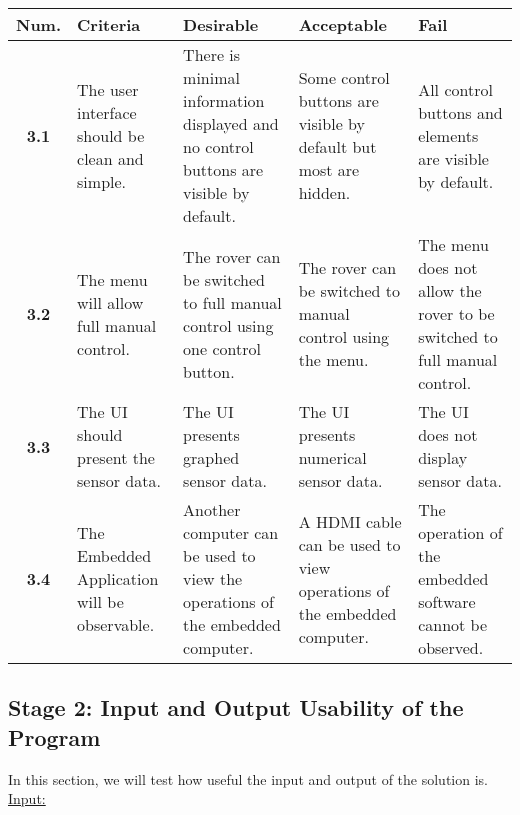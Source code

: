 \documentclass[11pt]{report}
\begin{document}
		\noindent
		\begin{tabularx}{\textwidth}{|S|B|B|B|B|}
			\hline
			\textbf{Num.}     & \textbf{Criteria}     & \textbf{Desirable}    & \textbf{Acceptable} &  \textbf{Fail}	 \\ \hline
			\textbf{3.1} & The user interface should be clean and simple.        & There is minimal information displayed and no control buttons are visible by default.   & Some control buttons are visible by default but most are hidden.  & All control buttons and elements are visible by default.      \\ \hline
			\textbf{3.2} & The menu will allow full manual control.        & The rover can be switched to full manual control using one control button.	&	The rover can be switched to manual control using the menu.	&  The menu does not allow the rover to be switched to full manual control.       \\ \hline
			\textbf{3.3} & The UI should present the sensor data. & The UI presents graphed sensor data.	&	The UI presents numerical sensor data.	&	The UI does not display sensor data. \\ \hline
			\textbf{3.4} & The Embedded Application will be observable. & Another computer can be used to view the operations of the embedded computer. 	&	A HDMI cable can be used to view operations of the embedded computer. 	&	The operation of the embedded software cannot be observed. \\ \hline   
		\end{tabularx}
		
	\subsection{Stage 2: Input and Output Usability of the Program}
	
		In this section, we will test how useful the input and output of the solution is.\\
	
		\underline{Input:} \\
	
\end{document}
